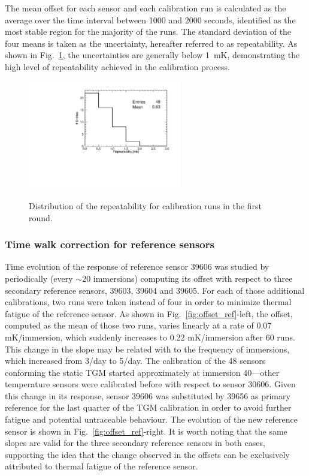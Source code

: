 The mean offset for each sensor and each calibration run is calculated as the average over the time interval between 1000 and 2000 seconds, identified as the most stable region for the majority of the runs. The standard deviation of the four means is taken as the uncertainty, hereafter referred to as repeatability. As shown in Fig.~\ref{fi:CAL_rms_1r}, the uncertainties are generally below 1~mK, demonstrating the high level of repeatability achieved in the calibration process.

\begin{figure}[htbp]
\centering
{\includegraphics[width=0.6\textwidth]{./figure_11.pdf}}
\caption{Distribution of the repeatability for calibration runs in the first round.}
\label{fi:CAL_rms_1r}
\end{figure}

\subsubsection{Time walk correction for reference sensors}
\label{sec:reference_corrections}
\noindent Time evolution of the response of reference sensor 39606 was studied by periodically (every $\sim$20 immersions)  computing its offset with respect to three secondary reference sensors, 39603, 39604 and 39605. For each of those additional calibrations, two runs were taken instead of four in order to minimize thermal fatigue of the reference sensor. As shown in Fig.~\ref{fig:offset_ref}-left, the offset, computed as the mean of those two runs, varies linearly at a rate of 0.07 mK/immersion, which suddenly increases to 0.22 mK/immersion after 60 runs. This change in the slope may be related with to the frequency of immersions, which increased from 3/day to 5/day. The calibration of the 48 sensors conforming the static TGM started approximately at immersion 40---other temperature sensors were calibrated before with respect to sensor 30606. Given this change in its response, sensor 39606 was substituted by 39656 as primary reference for the last quarter of the TGM calibration in order to avoid further fatigue and potential untraceable behaviour. The evolution of the new reference sensor is shown in Fig.~\ref{fig:offset_ref}-right. It is worth noting that the same slopes are valid for the three secondary reference sensors in both cases, supporting the idea that the change observed in the offsets can be exclusively attributed to thermal fatigue of the reference sensor.

